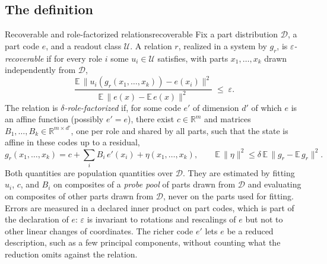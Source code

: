 \documentclass[10pt]{article}
\theoremstyle{plain}
\theoremstyle{remark}
\newcommand{\R}{\mathbb{R}}
\newcommand{\U}{\mathcal{U}}
\newcommand{\D}{\mathcal{D}}
\begin{document}
\subsection{The definition}

\begin{defbox}{Recoverable and role-factorized relations}{recoverable}
Fix a part distribution $\D$, a part code $e$, and a readout class $\U$. A relation $r$, realized in a system by $g_r$, is \emph{$\varepsilon$-recoverable} if for every role $i$ some $u_i \in \U$ satisfies, with parts $x_1, \ldots, x_k$ drawn independently from $\D$,
\begin{equation}
  \frac{\mathbb{E}\,\lVert u_i(g_r(x_1,\ldots,x_k)) - e(x_i) \rVert^2}{\mathbb{E}\,\lVert e(x) - \mathbb{E}\,e(x) \rVert^2} \;\le\; \varepsilon .
  \label{eq:recover}
\end{equation}
The relation is \emph{$\delta$-role-factorized} if, for some code $e'$ of dimension $d'$ of which $e$ is an affine function (possibly $e' = e$), there exist $c \in \R^m$ and matrices $B_1, \ldots, B_k \in \R^{m \times d'}$, one per role and shared by all parts, such that the state is affine in these codes up to a residual,
\begin{equation}
  g_r(x_1, \ldots, x_k) = c + \textstyle\sum_{i} B_i\, e'(x_i) + \eta(x_1, \ldots, x_k), \qquad \mathbb{E}\,\lVert \eta \rVert^2 \le \delta\, \mathbb{E}\,\lVert g_r - \mathbb{E}\,g_r \rVert^2 .
  \label{eq:factor}
\end{equation}
Both quantities are population quantities over $\D$. They are estimated by fitting $u_i$, $c$, and $B_i$ on composites of a \emph{probe pool} of parts drawn from $\D$ and evaluating on composites of other parts drawn from $\D$, never on the parts used for fitting. Errors are measured in a declared inner product on part codes, which is part of the declaration of $e$: $\varepsilon$ is invariant to rotations and rescalings of $e$ but not to other linear changes of coordinates. The richer code $e'$ lets $e$ be a reduced description, such as a few principal components, without counting what the reduction omits against the relation.
\end{defbox}
\end{document}
